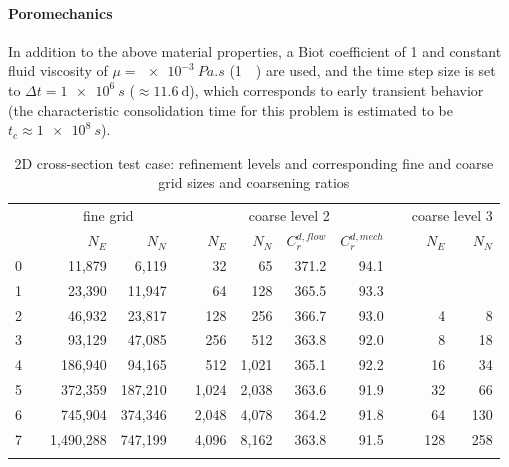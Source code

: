 \paragraph{Poromechanics}
In addition to the above material properties, a Biot coefficient of 1 and constant fluid viscosity of $\mu = \qty{e-3}{Pa.s}$ (\qty{1}{\centi\poise}) are used, and the time step size is set to $\Delta t = \qty{1e6}{s}$ ($\approx \qty{11.6}{\day}$), which corresponds to early transient behavior (the characteristic consolidation time for this problem is estimated to be $t_c \approx \qty{1e8}{s}$).

\begin{table}
    \centering
    \caption[2D cross-section test case refinement problem sizes]{2D cross-section test case: refinement levels and corresponding fine and coarse grid sizes and coarsening ratios}
    \label{tab:cross_section_dims}
    \begin{tabular}{rrrrrrrrrrrr}
        \hline\noalign{\smallskip}
        \multirow{2}{*}{$\ell$} & & \multicolumn{2}{c}{fine grid} & & \multicolumn{4}{c}{coarse level 2} & & \multicolumn{2}{c}{coarse level 3} \\
        \noalign{\smallskip}\cline{3-4} \cline{6-9} \cline{11-12}\noalign{\smallskip}
        & & $N_E$ & $N_N$ & & $N_E$ & $N_N$ & $C_r^{d,flow}$ & $C_r^{d,mech}$ & & $N_E$ & $N_N$ \\
        \hline\noalign{\smallskip}
        0 & &    11,879 &   6,119 & &    32 &    65 & 371.2 & 94.1 & &     &     \\
        1 & &    23,390 &  11,947 & &    64 &   128 & 365.5 & 93.3 & &     &     \\
        2 & &    46,932 &  23,817 & &   128 &   256 & 366.7 & 93.0 & &   4 &   8 \\
        3 & &    93,129 &  47,085 & &   256 &   512 & 363.8 & 92.0 & &   8 &  18 \\
        4 & &   186,940 &  94,165 & &   512 & 1,021 & 365.1 & 92.2 & &  16 &  34 \\
        5 & &   372,359 & 187,210 & & 1,024 & 2,038 & 363.6 & 91.9 & &  32 &  66 \\
        6 & &   745,904 & 374,346 & & 2,048 & 4,078 & 364.2 & 91.8 & &  64 & 130 \\
        7 & & 1,490,288 & 747,199 & & 4,096 & 8,162 & 363.8 & 91.5 & & 128 & 258 \\
        \hline\noalign{\smallskip}
    \end{tabular}
\end{table}

